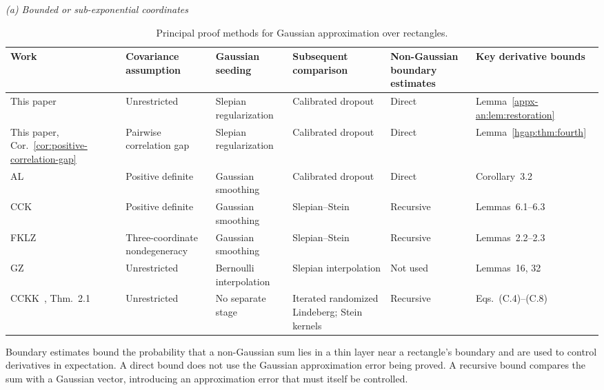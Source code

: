 \documentclass[11pt,letterpaper]{article}
\theoremstyle{remark}
\begin{document}
\begin{table}[!htb]

\centering
\small
\setlength{\tabcolsep}{4pt}
\renewcommand{\arraystretch}{1.1}
\caption{Principal proof methods for Gaussian approximation over rectangles.}
\label{tab:proof-comparison}
\smallskip
\textit{(a) Bounded or sub-exponential coordinates}\par\smallskip
{\setlength{\tabcolsep}{3pt}
\begin{tabularx}{\textwidth}{@{}>{\raggedright\arraybackslash}p{}
 >{\raggedright\arraybackslash}p{}
 >{\raggedright\arraybackslash}p{}
 >{\raggedright\arraybackslash}X
 >{\raggedright\arraybackslash}p{}
 >{\raggedright\arraybackslash}p{}@{}}
\toprule
Work & Covariance assumption & Gaussian seeding & Subsequent comparison & Non-Gaussian boundary estimates & Key derivative bounds \\
\midrule
This paper & Unrestricted & Slepian regularization & Calibrated dropout & Direct & Lemma~\ref{appx-an:lem:restoration} \\[2pt]
This paper, Cor.~\ref{cor:positive-correlation-gap} & Pairwise correlation gap & Slepian regularization & Calibrated dropout & Direct & Lemma~\ref{hgap:thm:fourth} \\[2pt]
AL~\cite{AL} & Positive definite & Gaussian smoothing & Calibrated dropout & Direct & Corollary~3.2 \\[2pt]
CCK~\cite{CCK} & Positive definite & Gaussian smoothing & Slepian--Stein & Recursive & Lemmas~6.1--6.3 \\[2pt]
FKLZ~\cite{FKLZ} & Three-coordinate nondegeneracy & Gaussian smoothing & Slepian--Stein & Recursive & Lemmas~2.2--2.3 \\[2pt]
GZ~\cite{GaoZhang} & Unrestricted & Bernoulli interpolation & Slepian interpolation & Not used & Lemmas~16, 32 \\[2pt]
CCKK~\cite{CCKK2022}, Thm.~2.1 & Unrestricted & No separate stage & Iterated randomized Lindeberg; Stein kernels & Recursive & Eqs.~(C.4)--(C.8) \\
\bottomrule
\end{tabularx}}
\smallskip
{\footnotesize\raggedright
Boundary estimates bound the probability that a non-Gaussian sum lies in a
thin layer near a rectangle's boundary and are used to control
derivatives in expectation. A direct bound does not use the Gaussian
approximation error being proved. A recursive bound compares the sum
with a Gaussian vector, introducing an approximation error that must
itself be controlled.\par}


\end{table}
\end{document}
